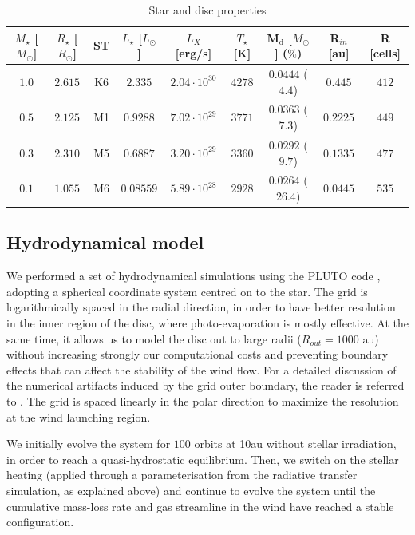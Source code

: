 \documentclass{aa}
\begin{document}
\begin{table}
\caption{Star and disc properties}
\label{tab:stars}
\centering
\begin{tabular}{c c c c c c c c c}
\hline
$M_\star$ [$M_\odot$] & $R_\star$ [$R_\odot$] & ST & $L_\star$ [$L_\odot$] & $L_X$ [erg/s] & $T_\star$ [K] & M$_\mathrm{d}$ [$M_\odot$] ($\%$) & R$_{in}$ [au] & R [cells]\\
\hline
   $1.0$ & $2.615$ & K6 & $2.335$ & $2.04 \cdot 10^{30}$ & $4278$ & $0.0444$ ($4.4$) & $0.445$ & $412$\\
   $0.5$ & $2.125$ & M1 & $0.9288$ & $7.02 \cdot 10^{29}$ & $3771$ & $0.0363$ ($7.3$) & $0.2225$ & $449$\\
   $0.3$ & $2.310$ & M5 & $0.6887$ & $3.20 \cdot 10^{29}$ & $3360$ & $0.0292$ ($9.7$) & $0.1335$ & $477$\\
   $0.1$ & $1.055$ & M6 & $0.08559$ & $5.89 \cdot 10^{28}$ & $2928$ & $0.0264$ ($26.4$) & $0.0445$ & $535$\\
\hline
\end{tabular}
\end{table}

\subsection{Hydrodynamical model}

We performed a set of hydrodynamical simulations using the \textsc{PLUTO} code , adopting a spherical coordinate system centred on to the star.
The grid is logarithmically spaced in the radial direction, in order to have better resolution in the inner region of the disc, where photo-evaporation is mostly effective.
At the same time, it allows us to model the disc out to large radii ($R_{out}= 1000$ au) without increasing strongly our computational costs and preventing boundary effects that can affect the stability of the wind flow.
For a detailed discussion of the numerical artifacts induced by the grid outer boundary, the reader is referred to .
The grid is spaced linearly in the polar direction to maximize the resolution at the wind launching region.

We initially evolve the system for $100$ orbits at \si{10}{au} without stellar irradiation, in order to reach a quasi-hydrostatic equilibrium.
Then, we switch on the stellar heating (applied through a parameterisation from the radiative transfer simulation, as explained above) and continue to evolve the system until the cumulative mass-loss rate and gas streamline in the wind have reached a stable configuration.
\end{document}
